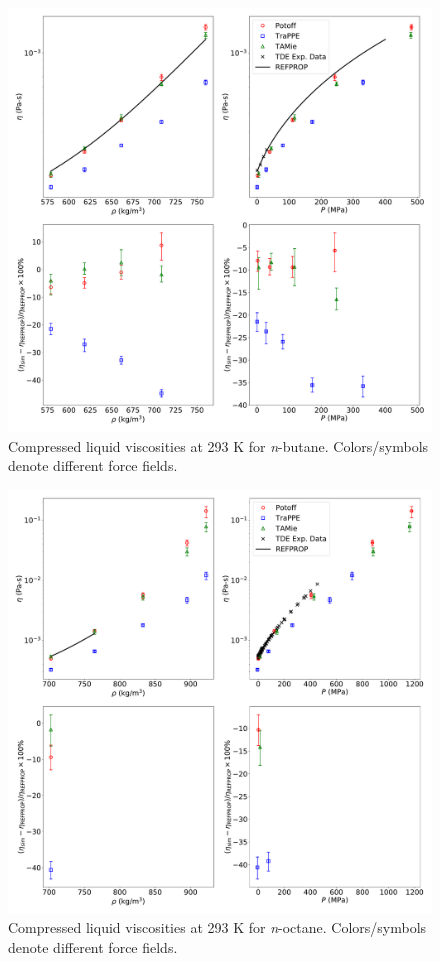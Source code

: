 \documentclass[preprint,review,12pt]{elsarticle}
\begin{document}
	\begin{figure}[htb!]
		\centering
		\includegraphics[width=6.4in]{compare_REFPROP_T293highP_C4H10_Pas_new_REFPROP.pdf}
		\caption{Compressed liquid viscosities at 293 K for \textit{n}-butane. Colors/symbols denote different force fields.}
		\label{fig:T293highP_C4}
	\end{figure} 
	
	\begin{figure}[htb!]
		\centering
		\includegraphics[width=6.4in]{compare_REFPROP_T293highP_C8H18_all.pdf}
		\caption{Compressed liquid viscosities at 293 K for \textit{n}-octane. Colors/symbols denote different force fields.}
		\label{fig:T293highP_C8}
	\end{figure} 
	
\end{document}
